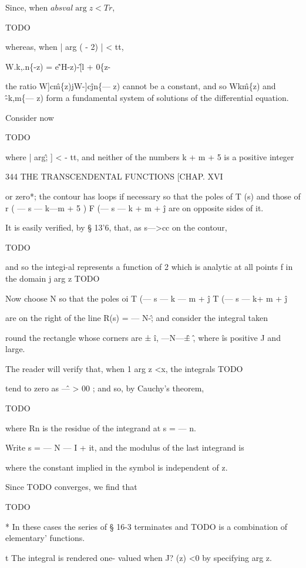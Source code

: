 Since, when $absval{\arg z} < Tr$,

TODO

whereas, when | arg ( - 2) | < tt,

W.k,.n\{-z) = e\^'H-z)-\^[l + 0\{z-%

the ratio W]c\^m\{z)jW-]c\^jn\{— z) cannot be a constant, and so
Wk\^m\{z) and \^-k,m\{— z) form a fundamental system of solutions of
the differential equation.


Consider now

TODO

where | arg\^; ] < - tt, and neither of the numbers k + m + 5 is a
positive integer

344 THE TRANSCENDENTAL FUNCTIONS [CHAP. XVI

or zero*; the contour has loops if necessary so that the poles of T
(s) and those of r ( — s — k—m + 5 ) F (— s — k + m + \^j are on
opposite sides of it.

It is easily verified, by § 13'6, that, as s—>cc on the contour,

TODO

and so the integi-al represents a function of 2 which is analytic at
all points f in the domain j arg z TODO

Now choose N so that the poles oi T (— s — k — m + \^j T (— s — k+ m +
\^j

are on the right of the line R(s) = — N-\^; and consider the integral
taken

round the rectangle whose corners are ± \^i, —N—\^± \^, where \^ is
positive J and large.

The reader will verify that, when 1 arg z <x, the integrals TODO

tend to zero as \^— > 00 ; and so, by Cauchy's theorem,

TODO

where Rn is the residue of the integrand at s = — n.

Write s = — N — I + it, and the modulus of the last integrand is

where the constant implied in the symbol is independent of z.

Since TODO converges, we find that

TODO

* In these cases the series of § 16-3 terminates and TODO is a
combination of elementary' functions.

t The integral is rendered one- valued when J? (z) <0 by specifying
arg z.

